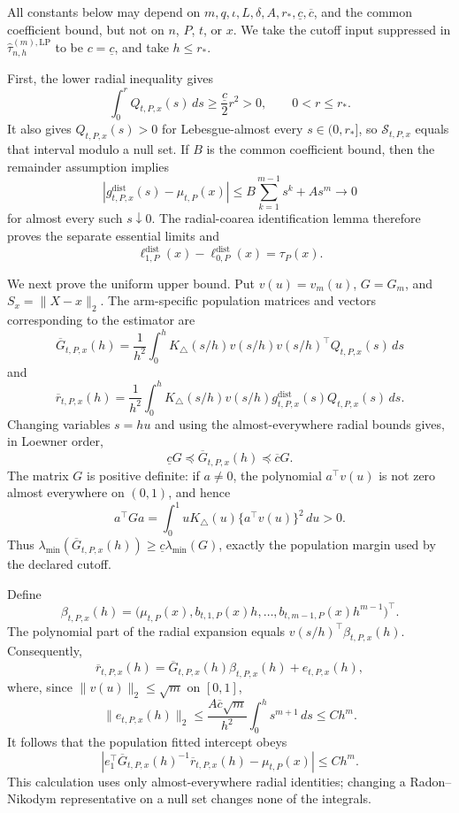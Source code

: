 All constants below may depend on \(m,q,\iota,L,\delta,A,r_*,\underline c,\overline c\), and the common coefficient bound, but not on \(n\), \(P\), \(t\), or \(x\).  We take the cutoff input suppressed in \(\widehat\tau^{(m),\mathrm{LP}}_{n,h}\) to be \(c=\underline c\), and take \(h\leq r_*\).

First, the lower radial inequality gives
\[
 \int_0^rQ_{t,P,x}(s)\,ds\geq\frac{\underline c}{2}r^2>0,
 \qquad 0<r\leq r_*.
\]
It also gives \(Q_{t,P,x}(s)>0\) for Lebesgue-almost every \(s\in(0,r_*]\), so \(\mathcal S_{t,P,x}\) equals that interval modulo a null set.  If \(B\) is the common coefficient bound, then the remainder assumption implies
\[
 |g^{\mathrm{dist}}_{t,P,x}(s)-\mu_{t,P}(x)|
 \leq B\sum_{k=1}^{m-1}s^k+As^m\longrightarrow0
\]
for almost every such \(s\downarrow0\).  The radial-coarea identification lemma therefore proves the separate essential limits and
\[
 \ell^{\mathrm{dist}}_{1,P}(x)-\ell^{\mathrm{dist}}_{0,P}(x)=\tau_P(x).
\]

We next prove the uniform upper bound.  Put \(v(u)=v_m(u)\), \(G=G_m\), and \(S_x=\lVert X-x\rVert_2\).  The arm-specific population matrices and vectors corresponding to the estimator are
\[
 \overline G_{t,P,x}(h)
 =\frac1{h^2}\int_0^hK_\triangle(s/h)v(s/h)v(s/h)^\top
 Q_{t,P,x}(s)\,ds
\]
and
\[
 \overline r_{t,P,x}(h)
 =\frac1{h^2}\int_0^hK_\triangle(s/h)v(s/h)
 g^{\mathrm{dist}}_{t,P,x}(s)Q_{t,P,x}(s)\,ds.
\]
Changing variables \(s=hu\) and using the almost-everywhere radial bounds gives, in Loewner order,
\[
 \underline cG\preceq\overline G_{t,P,x}(h)
 \preceq\overline cG.
\]
The matrix \(G\) is positive definite: if \(a\neq0\), the polynomial \(a^\top v(u)\) is not zero almost everywhere on \((0,1)\), and hence
\[
 a^\top Ga=\int_0^1uK_\triangle(u)\{a^\top v(u)\}^2\,du>0.
\]
Thus \(\lambda_{\min}(\overline G_{t,P,x}(h))\geq\underline c\lambda_{\min}(G)\), exactly the population margin used by the declared cutoff.

Define
\[
 \beta_{t,P,x}(h)
 =\bigl(\mu_{t,P}(x),b_{t,1,P}(x)h,\ldots,
 b_{t,m-1,P}(x)h^{m-1}\bigr)^\top.
\]
The polynomial part of the radial expansion equals \(v(s/h)^\top\beta_{t,P,x}(h)\).  Consequently,
\[
 \overline r_{t,P,x}(h)
 =\overline G_{t,P,x}(h)\beta_{t,P,x}(h)+e_{t,P,x}(h),
\]
where, since \(\lVert v(u)\rVert_2\leq\sqrt m\) on \([0,1]\),
\[
 \lVert e_{t,P,x}(h)\rVert_2
 \leq\frac{A\overline c\sqrt m}{h^2}
 \int_0^h s^{m+1}\,ds
 \leq C h^m.
\]
It follows that the population fitted intercept obeys
\[
 \left|e_1^\top\overline G_{t,P,x}(h)^{-1}
 \overline r_{t,P,x}(h)-\mu_{t,P}(x)\right|
 \leq Ch^m.
\]
This calculation uses only almost-everywhere radial identities; changing a Radon--Nikodym representative on a null set changes none of the integrals.

